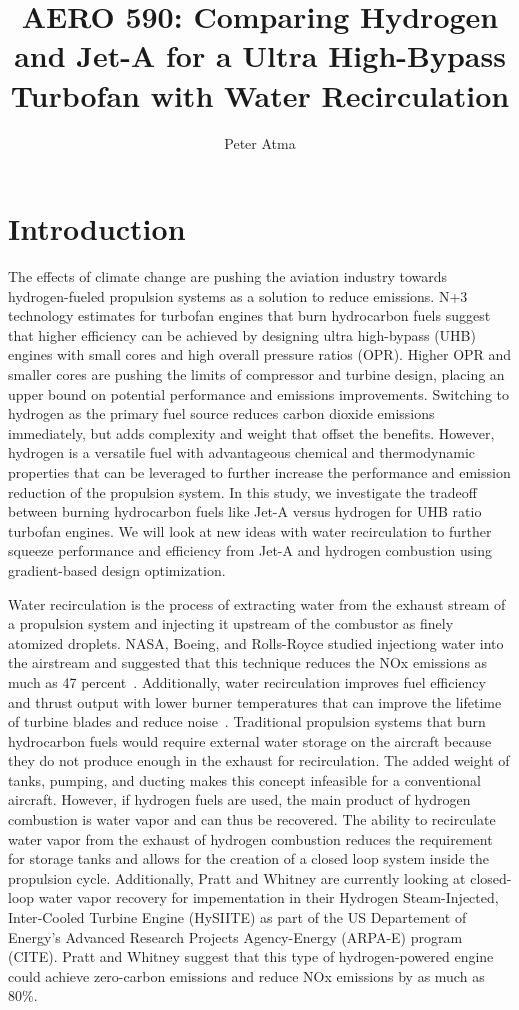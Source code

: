 \documentclass[12pt]{article}
\title{AERO 590: Comparing Hydrogen and Jet-A for a Ultra High-Bypass Turbofan with Water Recirculation}
\author{Peter Atma}
\begin{document}
\maketitle

\section{Introduction}
The effects of climate change are pushing the aviation industry towards hydrogen-fueled propulsion systems as a solution to reduce emissions.
N+3 technology estimates for turbofan engines that burn hydrocarbon fuels suggest that higher efficiency can be achieved by designing ultra high-bypass (UHB) engines with small cores and high overall pressure ratios (OPR).
Higher OPR and smaller cores are pushing the limits of compressor and turbine design, placing an upper bound on potential performance and emissions improvements.
Switching to hydrogen as the primary fuel source reduces carbon dioxide emissions immediately, but adds complexity and weight that offset the benefits.
However, hydrogen is a versatile fuel with advantageous chemical and thermodynamic properties that can be leveraged to further increase the performance and emission reduction of the propulsion system.
In this study, we investigate the tradeoff between burning hydrocarbon fuels like Jet-A versus hydrogen for UHB ratio turbofan engines.
We will look at new ideas with water recirculation to further squeeze performance and efficiency from Jet-A and hydrogen combustion using gradient-based design optimization.

Water recirculation is the process of extracting water from the exhaust stream of a propulsion system and injecting it upstream of the combustor as finely atomized droplets.
NASA, Boeing, and Rolls-Royce studied injectiong water into the airstream and suggested that this technique reduces the NOx emissions as much as 47 percent~\cite{nasa_inject}.
Additionally, water recirculation improves fuel efficiency and thrust output with lower burner temperatures that can improve the lifetime of turbine blades and reduce noise~\cite{nasa_inject}.
Traditional propulsion systems that burn hydrocarbon fuels would require external water storage on the aircraft because they do not produce enough in the exhaust for recirculation.
The added weight of tanks, pumping, and ducting makes this concept infeasible for a conventional aircraft.
However, if hydrogen fuels are used, the main product of hydrogen combustion is water vapor and can thus be recovered.
The ability to recirculate water vapor from the exhaust of hydrogen combustion reduces the requirement for storage tanks and allows for the creation of a closed loop system inside the propulsion cycle.
Additionally, Pratt and Whitney are currently looking at closed-loop water vapor recovery for impementation in their Hydrogen Steam-Injected, Inter‐Cooled Turbine Engine (HySIITE) as part of the US Departement of Energy's Advanced Research Projects Agency-Energy (ARPA-E) program (CITE).
Pratt and Whitney suggest that this type of hydrogen-powered engine could achieve zero-carbon emissions and reduce NOx emissions by as much as 80\%.
\end{document}
